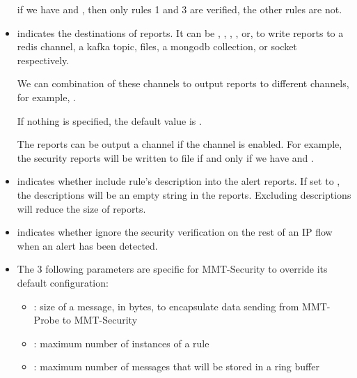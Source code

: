 \begin{itemize}
   \note if we have  and , 
   then only rules 1 and 3 are verified, the other rules are not.

   
   
   \item {} indicates the destinations of reports. 
   It can be , , , , or,  
   to write reports to a redis channel, a kafka topic, files, a mongodb collection, or socket respectively.
   
   We can combination of these channels to output reports to different channels, for example,  . 
   
   If nothing is specified, the default value is .
   
   \note The reports can be output a channel if the channel is enabled.
   For example, the security reports will be written to file if and only if we have
     and .
    
    
    
    \item {} indicates whether include rule's description into the alert reports.
    If set to \false, the descriptions will be an empty string in the reports.
    Excluding descriptions will reduce the size of reports.
   
    \item {} indicates whether ignore the security verification on the rest of an IP flow when an alert has been detected.
   
   
   \item The 3 following parameters are specific for MMT-Security to override its default configuration:
    \begin{itemize}
    \item {}: size of a message, in bytes, to encapsulate data sending from MMT-Probe to MMT-Security
    \item {}: maximum number of instances of a rule
    \item {}: maximum number of messages that will be stored in a ring buffer
    \end{itemize}
    

\end{itemize}

